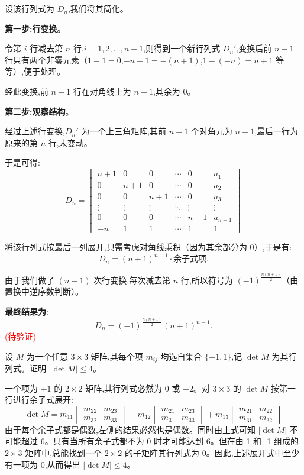 \begin{questions}
\begin{solution}
    设该行列式为 $D_n$,我们将其简化。
    
    \textbf{第一步:行变换}。
    
    令第 $i$ 行减去第 $n$ 行,$i = 1,2,\ldots,n-1$,则得到一个新行列式 $D_n'$,变换后前 $n{-}1$ 行只有两个非零元素（$1{-}1=0$,$-n{-}1=-(n{+}1)$,$1{-}(-n)=n{+}1$ 等等）,便于处理。
    
    经此变换,前 $n{-}1$ 行在对角线上为 $n{+}1$,其余为 $0$。
    
    \textbf{第二步:观察结构}。
    
    经过上述行变换,$D_n'$ 为一个上三角矩阵,其前 $n{-}1$ 个对角元为 $n+1$,最后一行为原来的第 $n$ 行,未变动。
    
    于是可得:
    \[
    D_n = \begin{vmatrix}
    n+1 & 0   & 0   & \cdots & 0   & a_1 \\
    0   & n+1 & 0   & \cdots & 0   & a_2 \\
    0   & 0   & n+1 & \cdots & 0   & a_3 \\
    \vdots & \vdots & \vdots & \ddots & \vdots & \vdots \\
    0   & 0   & 0   & \cdots & n+1 & a_{n-1} \\
    - n & 1   & 1   & \cdots & 1   & 1
    \end{vmatrix}
    \]
    
    将该行列式按最后一列展开,只需考虑对角线乘积（因为其余部分为 0）,于是有:
    \[
    D_n = (n+1)^{n-1} \cdot \text{余子式项}.
    \]
    
    由于我们做了 $(n-1)$ 次行变换,每次减去第 $n$ 行,所以符号为 $(-1)^{\frac{n(n+1)}{2}}$（由置换中逆序数判断）。
    
    \textbf{最终结果为}:
    \[
    \boxed{D_n = (-1)^{\frac{n(n+1)}{2}} (n+1)^{n-1}}.
    \]
    \textcolor{red}{(待验证)}
\end{solution}

\question 设 $M$ 为一个任意 $3 \times 3$ 矩阵,其每个项 $m_{ij}$ 均选自集合 $\{-1, 1\}$,记 $\det M$ 为其行列式。证明 $|\det M| \leq 4$。
\begin{solution}
一个项为 $\pm 1$ 的 $2 \times 2$ 矩阵,其行列式必然为 0 或 $\pm 2$。对 $3 \times 3$ 的 $\det M$ 按第一行进行余子式展开:
\[
\det M = m_{11} \begin{vmatrix} m_{22} & m_{23} \\ m_{32} & m_{33} \end{vmatrix} - m_{12} \begin{vmatrix} m_{21} & m_{23} \\ m_{31} & m_{33} \end{vmatrix} + m_{13} \begin{vmatrix} m_{21} & m_{22} \\ m_{31} & m_{32} \end{vmatrix}
\]
由于每个余子式都是偶数,左侧的结果必然也是偶数。同时由上式可知 $|\det M|$ 不可能超过 6。只有当所有余子式都不为 0 时才可能达到 6。但在由 1 和 -1 组成的 $2 \times 3$ 矩阵中,总能找到一个 $2 \times 2$ 的子矩阵其行列式为 0。因此,上述展开式中至少有一项为 0,从而得出 $|\det M| \leq 4$。
\end{solution}


\end{questions}
